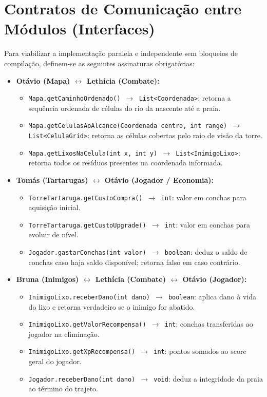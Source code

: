 \documentclass[11pt,a4paper]{article}
\begin{document}
\section{Contratos de Comunicação entre Módulos (Interfaces)}

Para viabilizar a implementação paralela e independente sem bloqueios de compilação, definem-se as seguintes assinaturas obrigatórias:

\begin{itemize}[leftmargin=*]
  \item \textbf{Otávio (Mapa) $\leftrightarrow$ Lethícia (Combate):}
  \begin{itemize}
    \item \texttt{Mapa.getCaminhoOrdenado() $\rightarrow$ List<Coordenada>}: retorna a sequência ordenada de células do rio da nascente até a praia.
    \item \texttt{Mapa.getCelulasAoAlcance(Coordenada centro, int range) $\rightarrow$ List<CelulaGrid>}: retorna as células cobertas pelo raio de visão da torre.
    \item \texttt{Mapa.getLixosNaCelula(int x, int y) $\rightarrow$ List<InimigoLixo>}: retorna todos os resíduos presentes na coordenada informada.
  \end{itemize}

  \item \textbf{Tomás (Tartarugas) $\leftrightarrow$ Otávio (Jogador / Economia):}
  \begin{itemize}
    \item \texttt{TorreTartaruga.getCustoCompra() $\rightarrow$ int}: valor em conchas para aquisição inicial.
    \item \texttt{TorreTartaruga.getCustoUpgrade() $\rightarrow$ int}: valor em conchas para evoluir de nível.
    \item \texttt{Jogador.gastarConchas(int valor) $\rightarrow$ boolean}: deduz o saldo de conchas caso haja saldo disponível; retorna falso em caso contrário.
  \end{itemize}

  \item \textbf{Bruna (Inimigos) $\leftrightarrow$ Lethícia (Combate) $\leftrightarrow$ Otávio (Jogador):}
  \begin{itemize}
    \item \texttt{InimigoLixo.receberDano(int dano) $\rightarrow$ boolean}: aplica dano à vida do lixo e retorna verdadeiro se o inimigo for abatido.
    \item \texttt{InimigoLixo.getValorRecompensa() $\rightarrow$ int}: conchas transferidas ao jogador na eliminação.
    \item \texttt{InimigoLixo.getXpRecompensa() $\rightarrow$ int}: pontos somados ao score geral do jogador.
    \item \texttt{Jogador.receberDano(int dano) $\rightarrow$ void}: deduz a integridade da praia ao término do trajeto.
  \end{itemize}


\end{itemize}
\end{document}
